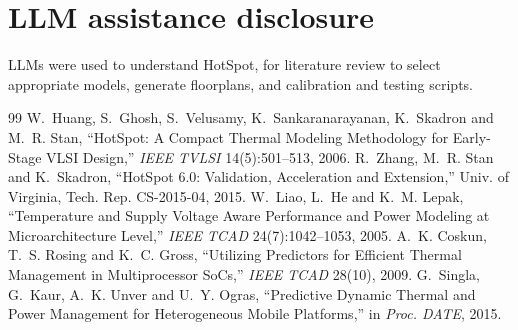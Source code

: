 \documentclass[11pt,a4paper]{article}
\begin{document}
\section{LLM assistance disclosure}
LLMs were used to understand HotSpot, for literature review to select appropriate models, generate
floorplans, and calibration and testing scripts.

\begin{thebibliography}{99}\small
\setlength{\itemsep}{0pt}
 W.~Huang, S.~Ghosh, S.~Velusamy, K.~Sankaranarayanan, K.~Skadron and
  M.~R. Stan, ``HotSpot: A Compact Thermal Modeling Methodology for Early-Stage VLSI Design,''
  \emph{IEEE TVLSI} 14(5):501--513, 2006.
 R.~Zhang, M.~R. Stan and K.~Skadron, ``HotSpot 6.0: Validation, Acceleration
  and Extension,'' Univ. of Virginia, Tech. Rep. CS-2015-04, 2015.
 W.~Liao, L.~He and K.~M. Lepak, ``Temperature and Supply Voltage Aware
  Performance and Power Modeling at Microarchitecture Level,'' \emph{IEEE TCAD} 24(7):1042--1053,
  2005.
 A.~K. Coskun, T.~S. Rosing and K.~C. Gross, ``Utilizing Predictors for
  Efficient Thermal Management in Multiprocessor SoCs,'' \emph{IEEE TCAD} 28(10), 2009.
 G.~Singla, G.~Kaur, A.~K. Unver and U.~Y. Ogras, ``Predictive Dynamic Thermal
  and Power Management for Heterogeneous Mobile Platforms,'' in \emph{Proc. DATE}, 2015.
\end{thebibliography}
\end{document}
